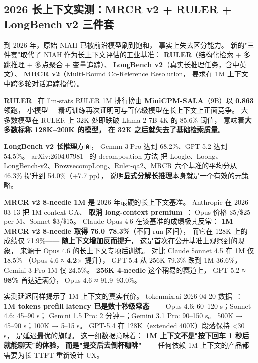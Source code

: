 \subsection{2026 长上下文实测：MRCR v2 + RULER + LongBench v2 三件套}
\label{sec:long-context-benchmarks-2026}

到 2026 年，原始 NIAH 已被前沿模型刷到饱和，
事实上失去区分能力。
新的"三件套"取代了 NIAH 作为长上下文评估的工业基准：
\textbf{RULER}（结构化检索 + 多跳推理 + 多点聚合 + 变量追踪）、
\textbf{LongBench v2}（真实长推理任务，含中英文）、
\textbf{MRCR v2}（Multi-Round Co-Reference Resolution，
要求在 1M 上下文中跨多轮对话追踪指代）。

\textbf{RULER}~\cite{hsieh2024ruler} 在
llm-stats RULER 1M 排行榜由
\textbf{MiniCPM-SALA}（9B）以 \textbf{0.863} 领跑，
小模型 + 精巧训练再次证明可与百亿级模型在长上下文上正面竞争。
大多数模型在 RULER 上 32K 处即跌破
Llama-2-7B 4K 的 85.6\% 阈值，
意味着\textbf{大多数标称 128K--200K 的模型，
在 32K 之后就失去了基础检索质量}。

\textbf{LongBench v2 长推理}方面，
Gemini 3 Pro 达到 68.2\%、GPT-5.2 达到 54.5\%。
arXiv:2604.07981~\cite{longbenchv2decomp2026} 的 decomposition 方法
把 Loogle、Loong、LongBench-v2、BrowsecompLong、Ruler-qa2、MRCR
六个基准的平均分从 46.3\% 提升到 54.0\%（+7.7 pp），
说明\textbf{显式分解长推理}本身就是一个有效的元策略。

\textbf{MRCR v2 8-needle 1M} 是 2026 年最硬的长上下文基准。
Anthropic 在 2026-03-13 把 1M context GA、
\textbf{取消 long-context premium}~\cite{anthropic2026context1m}：
Opus 价格 \$5/\$25 per M、Sonnet \$3/\$15。
Claude Opus 4.6 在该基准的成绩极其反常：
\textbf{1M MRCR v2 8-needle 取得 76.0--78.3\%}（不同 run 区间），
而它在 128K 上的成绩仅 71.9\%——
\textbf{随上下文增加反而提升}，
这是首次在公开基准上观察到的现象，
来源于 Opus 4.6 的长上下文专项后训练。
对比 Claude Sonnet 4.5 在 1M 仅 18.5\%
（Opus 4.6 ≈ \textbf{4.2$\times$} 提升），
GPT-5.4 从 256K 79.3\% 跌到 1M 36.6\%，
Gemini 3 Pro 1M 仅 24.5\%。
\textbf{256K 4-needle} 这个稍易的赛道上，
GPT-5.2 ≈ \textbf{98\%} 首达近满分，
Opus 4.6 ≈ 91.9--93.0\%。

实测延迟同样揭示了 1M 上下文的真实代价。
tokenmix.ai 2026-04-20 数据~\cite{tokenmix2026latency}：
\textbf{1M tokens prefill latency 已是数十秒级常态}——
Opus 4.6: 60--120 s；Sonnet 4.6: 45--90 s；
Gemini 1.5 Pro: 2 分钟+；Gemini 3.1 Pro: 90--150 s。
500K → 45--90 s；100K → 5--15 s。
GPT-5.4 在 128K（extended 400K）段落保持 \textless 30 s，
是延迟最优的旗舰。
这一组数据意味着：
\textbf{1M 上下文不是"按下回车 1 秒后就能聊天"的体验，
而是"提交后去倒杯咖啡"}——
任何依赖 1M 上下文的产品都需要为长 TTFT 重新设计 UX。

